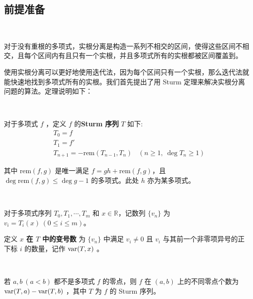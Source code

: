\subsection{前提准备}

\begin{problem}[实根分离]~
	
	对于没有重根的多项式，实根分离是构造一系列不相交的区间，使得这些区间不相交，且每个区间内有且只有一个实根，并且多项式所有的实根都被区间覆盖到。
	
	
\end{problem}

使用实根分离可以更好地使用迭代法，因为每个区间只有一个实根，那么迭代法就能快速地找到多项式所有的实根。我们首先提出了用 Sturm 定理来解决实根分离问题的算法。定理说明如下：

\begin{definition}[Sturm 序列]~
	
	对于多项式 $f$ ，定义 $f$ 的\textbf{Sturm 序列} $T$ 如下:
	$$
	\begin{aligned}
		& T_0 = f \\
		& T_1 = f' \\
		& T_{n + 1} = -\textrm{rem}(T_{n - 1}, T_n) \ \ \ \ (n \ge 1, \ \deg {T_n} \ge 1)
	\end{aligned}
	$$
	
	其中 $\textrm{rem}(f, g)$ 是唯一满足 $f = gh + \textrm{rem}(f, g)$，且 $\deg \textrm{rem}(f, g) \le \deg g - 1$ 的多项式。此处 $h$ 亦为某多项式。
	
	
\end{definition}

\begin{definition}[实数在多项式序列中的变号数]~
	
	对于多项式序列 $T_0, T_1, \cdots, T_m$ 和 $x \in \mathbb{R}$，记数列 $\{v_n\}$ 为 $v_i = T_i(x) \ (0 \le i \le m)$。
	
	定义\textbf{ $x$ 在 $T$ 中的变号数} 为 $\{v_n\}$ 中满足 $v_i \neq 0$ 且 $v_i$ 与其前一个非零项异号的正下标 $i$ 的数量，记作 $\mathrm{var}(T, x)$ 。
	
	
\end{definition}

\begin{theorem}[Sturm 定理]~
	
	若 $a, b \ (a < b)$ 都不是多项式 $f$ 的零点，则 $f$ 在 $(a, b)$ 上的不同零点个数为 $\mathrm{var}(T, a) - \mathrm{var}(T, b)$ ，其中 $T$ 为 $f$ 的 Sturm 序列。 
	
	
\end{theorem}

